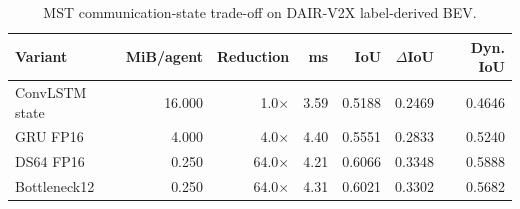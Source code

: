 \begin{table}[t]
\centering
\scriptsize
\caption{MST communication-state trade-off on DAIR-V2X label-derived BEV.}
\label{tab:dair-mst-tradeoff}
\begin{tabular}{lrrrrrr}
\toprule
Variant & MiB/agent & Reduction & ms & IoU & $\Delta$IoU & Dyn. IoU \\
\midrule
ConvLSTM state & 16.000 & 1.0$\times$ & 3.59 & 0.5188 & 0.2469 & 0.4646 \\
GRU FP16 & 4.000 & 4.0$\times$ & 4.40 & 0.5551 & 0.2833 & 0.5240 \\
DS64 FP16 & 0.250 & 64.0$\times$ & 4.21 & 0.6066 & 0.3348 & 0.5888 \\
Bottleneck12 & 0.250 & 64.0$\times$ & 4.31 & 0.6021 & 0.3302 & 0.5682 \\
\bottomrule
\end{tabular}
\end{table}
